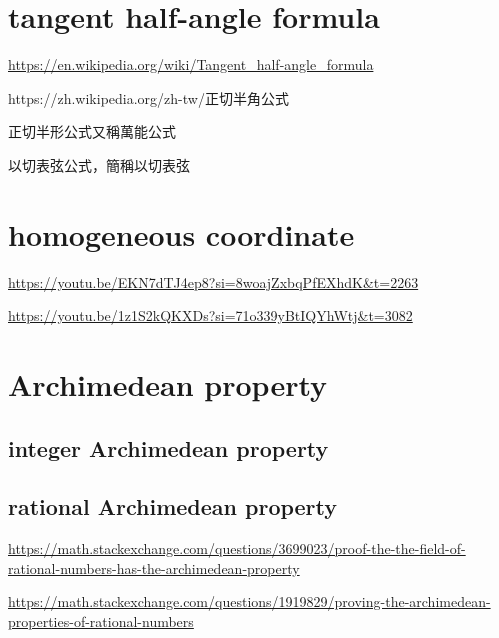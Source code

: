 \documentclass[
]{book}
\theoremstyle{definition}
\theoremstyle{definition}
\theoremstyle{definition}
\theoremstyle{definition}
\theoremstyle{remark}
\begin{document}
\hypertarget{tangent-half-angle-formula}{%
\chapter{tangent half-angle formula}\label{tangent-half-angle-formula}}

\url{https://en.wikipedia.org/wiki/Tangent_half-angle_formula}

\begin{CJK}{UTF8}{bsmi}

https://zh.wikipedia.org/zh-tw/正切半角公式

正切半形公式又稱萬能公式

以切表弦公式，簡稱以切表弦

\end{CJK}

\hypertarget{homogeneous-coordinate-1}{%
\chapter{homogeneous coordinate}\label{homogeneous-coordinate-1}}

\url{https://youtu.be/EKN7dTJ4ep8?si=8woajZxbqPfEXhdK\&t=2263}

\url{https://youtu.be/1z1S2kQKXDs?si=71o339yBtIQYhWtj\&t=3082}

\hypertarget{archimedean-property}{%
\chapter{Archimedean property}\label{archimedean-property}}

\hypertarget{integer-archimedean-property}{%
\section{integer Archimedean property}\label{integer-archimedean-property}}

\hypertarget{rational-archimedean-property}{%
\section{rational Archimedean property}\label{rational-archimedean-property}}

\url{https://math.stackexchange.com/questions/3699023/proof-the-the-field-of-rational-numbers-has-the-archimedean-property}

\url{https://math.stackexchange.com/questions/1919829/proving-the-archimedean-properties-of-rational-numbers}
\end{document}

